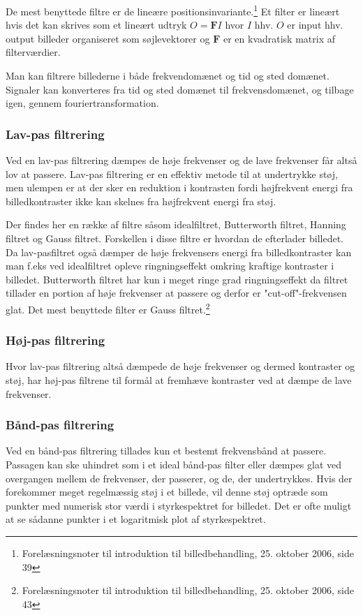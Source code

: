 De mest benyttede filtre er de lineære positionsinvariante.\footnote{Forelæsningsnoter til introduktion til billedbehandling, 25. oktober 2006, side 39} Et filter er lineært hvis det kan skrives som et lineært udtryk $O=\mathbf{F}I$ hvor $I$ hhv. $O$ er input hhv. output billeder organiseret som søjlevektorer og $\mathbf{F}$ er en kvadratisk matrix af filterværdier. 

Man kan filtrere billederne i både frekvendomænet og tid og sted domænet. Signaler kan konverteres fra tid og sted domænet til frekvensdomænet, og tilbage igen, gennem fouriertransformation.

\subsubsection{Lav-pas filtrering}
Ved en lav-pas filtrering dæmpes de høje frekvenser og de lave frekvenser får altså lov at passere. Lav-pas filtrering er en effektiv metode til at undertrykke støj, men ulempen er at der sker en reduktion i kontrasten fordi højfrekvent energi fra billedkontraster ikke kan skelnes fra højfrekvent energi fra støj.

Der findes her en række af filtre såsom idealfiltret, Butterworth filtret, Hanning filtret og Gauss filtret. Forskellen i disse filtre er hvordan de efterlader billedet. Da lav-pasfiltret også dæmper de høje frekvensers energi fra billedkontraster kan man f.eks ved idealfiltret opleve ringningseffekt omkring kraftige kontraster i billedet. Butterworth filtret har kun i meget ringe grad ringningseffekt da filtret tillader en portion af høje frekvenser at passere og derfor er "cut-off"-frekvensen glat. Det mest benyttede filter er Gauss filtret.\footnote{Forelæsningsnoter til introduktion til billedbehandling, 25. oktober 2006, side 43}

\subsubsection{Høj-pas filtrering}
Hvor lav-pas filtrering altså dæmpede de høje frekvenser og dermed kontraster og støj, har høj-pas filtrene til formål at fremhæve kontraster ved at dæmpe de lave frekvenser. 

\subsubsection{Bånd-pas filtrering}
Ved en bånd-pas filtrering tillades kun et bestemt frekvensbånd at passere. Passagen kan ske uhindret som i et ideal bånd-pas filter eller dæmpes glat ved overgangen mellem de frekvenser, der passerer, og de, der undertrykkes. Hvis der forekommer meget regelmæssig støj i et billede, vil denne støj optræde som punkter med numerisk stor værdi i styrkespektret for billedet. Det er ofte muligt at se sådanne punkter i et logaritmisk plot af styrkespektret.

